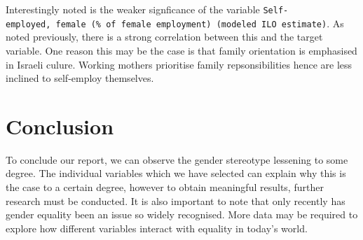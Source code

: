 \documentclass[11pt,a4paper,]{article}
\begin{document}
Interestingly noted is the weaker signficance of the variable \texttt{Self-employed,\ female\ (\%\ of\ female\ employment)\ (modeled\ ILO\ estimate)}. As noted previously, there is a strong correlation between this and the target variable. One reason this may be the case is that family orientation is emphasised in Israeli culure. Working mothers prioritise family repsonsibilities hence are less inclined to self-employ themselves.

\section*{Conclusion}

To conclude our report, we can observe the gender stereotype lessening to some degree. The individual variables which we have selected can explain why this is the case to a certain degree, however to obtain meaningful results, further research must be conducted. It is also important to note that only recently has gender equality been an issue so widely recognised. More data may be required to explore how different variables interact with equality in today's world.

\pagebreak

\printbibliography
\end{document}
